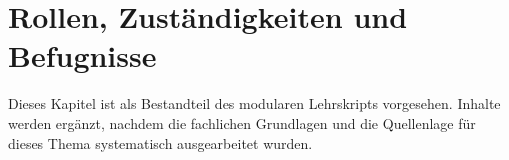 \chapter{Rollen, Zuständigkeiten und Befugnisse}
\label{chap:15-rollen-und-befugnisse}

Dieses Kapitel ist als Bestandteil des modularen Lehrskripts vorgesehen.
Inhalte werden ergänzt, nachdem die fachlichen Grundlagen und die
Quellenlage für dieses Thema systematisch ausgearbeitet wurden.
